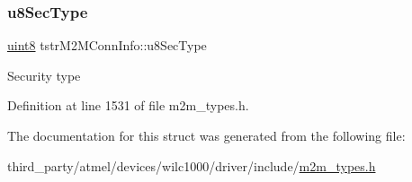 \subsubsection{\texorpdfstring{u8\+Sec\+Type}{u8SecType}}
{\footnotesize\ttfamily \hyperlink{group__DataT_ga4df709a77647e870bbf1d955b8edc9a6}{uint8} tstr\+M2\+M\+Conn\+Info\+::u8\+Sec\+Type}

Security type 

Definition at line 1531 of file m2m\+\_\+types.\+h.



The documentation for this struct was generated from the following file\+:\begin{DoxyCompactItemize}
\item 
third\+\_\+party/atmel/devices/wilc1000/driver/include/\hyperlink{m2m__types_8h}{m2m\+\_\+types.\+h}\end{DoxyCompactItemize}
